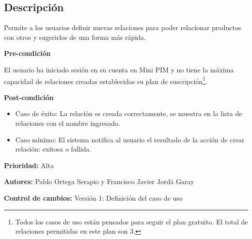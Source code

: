 
\subsection*{Descripción}
Permite a los usuarios definir nuevas relaciones para poder relacionar productos con otros y sugerirlos de una forma más rápida.\par
\vspace{0.15cm}

\textbf{Pre-condición}\par
El usuario ha iniciado sesión en su cuenta en Mini PIM y no tiene la máxima capacidad de relaciones creadas establecidas su plan de suscripción\footnote{Todos los casos de uso están pensados para seguir el plan gratuito. El total de relaciones permitidas en este plan son 3.}.\par
\vspace{0.15cm}

\textbf{Post-condición}
\begin{itemize}
    \item Caso de éxito: La relación es creada correctamente, se muestra en la lista de relaciones con el nombre ingresado.
    \item Caso mínimo: El sistema notifica al usuario el resultado de la acción de crear relación: exitosa o fallida.
\end{itemize}

\textbf{Prioridad: }
Alta
\vspace{0.15cm}

\textbf{Autores: }
Pablo Ortega Serapio y Francisco Javier Jordá Garay\par
\vspace{0.15cm}

\textbf{Control de cambios: } Versión 1: Definición del caso de uso

